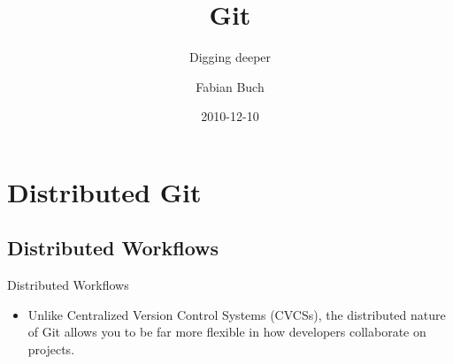 \documentclass{beamer}
\title[] %
{Git}
\subtitle
{Digging deeper}
\author[] %
{Fabian Buch}
\institute[] %
{Synyx GmbH \& Co. KG}
\date[] %
{2010-12-10}
\begin{document}



\begin{frame}
  \titlepage
\end{frame}







\section{Distributed Git}

\subsection{Distributed Workflows}

\begin{frame}{Distributed Workflows}
  \begin{itemize}
  \item
    Unlike Centralized Version Control Systems (CVCSs), the distributed nature of Git allows you to be far more flexible in how developers collaborate on projects.
  \end{itemize}
\end{frame}
\end{document}
